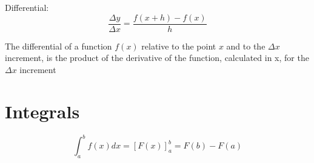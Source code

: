 \documentclass{article}
\begin{document}
Differential:
\begin{equation}
\frac{\Delta y}{\Delta x} = \frac{f(x+h)-f(x)}{h}
\end{equation}

The differential of a function $f(x)$ relative to the point $x$ and to the $\Delta x$ increment, is the product of the derivative of the function, calculated in x, for the $\Delta x$ increment
\section{Integrals}

\begin{equation}
\int_{a}^{b} f(x) dx = [F(x)]_{a}^{b} = F(b) - F(a)
\end{equation}
\end{document}
